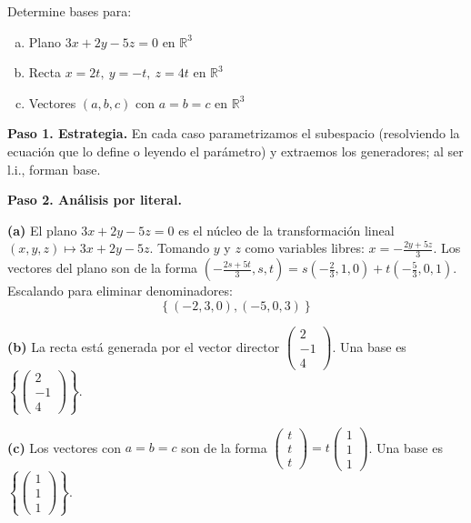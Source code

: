 \begin{prob} Determine bases para:
\begin{enumerate}[(a)]
\item Plano $3x+2y-5z=0$ en $\mathbb{R}^3$
\item Recta $x=2t,\ y=-t,\ z=4t$ en $\mathbb{R}^3$
\item Vectores $(a,b,c)$ con $a=b=c$ en $\mathbb{R}^3$
\end{enumerate}

\begin{myproof}
\textbf{Paso 1. Estrategia.} En cada caso parametrizamos el subespacio (resolviendo la ecuación que lo define o leyendo el parámetro) y extraemos los generadores; al ser l.i., forman base.

\textbf{Paso 2. Análisis por literal.}

\textbf{(a)} El plano $3x+2y-5z=0$ es el núcleo de la transformación lineal $(x,y,z) \mapsto 3x+2y-5z$. Tomando $y$ y $z$ como variables libres: $x = -\frac{2y+5z}{3}$. Los vectores del plano son de la forma $\left(-\frac{2s+5t}{3}, s, t\right) = s\left(-\frac{2}{3}, 1, 0\right) + t\left(-\frac{5}{3}, 0, 1\right)$. Escalando para eliminar denominadores:
$$\boxed{\left\{\left(-2, 3, 0\right), \left(-5, 0, 3\right)\right\}}$$

\textbf{(b)} La recta está generada por el vector director $\begin{pmatrix}2\\-1\\4\end{pmatrix}$. Una base es $\boxed{\left\{\begin{pmatrix}2\\-1\\4\end{pmatrix}\right\}}$.

\textbf{(c)} Los vectores con $a=b=c$ son de la forma $\begin{pmatrix}t\\t\\t\end{pmatrix} = t\begin{pmatrix}1\\1\\1\end{pmatrix}$. Una base es $\boxed{\left\{\begin{pmatrix}1\\1\\1\end{pmatrix}\right\}}$.
\end{myproof}
\end{prob}

